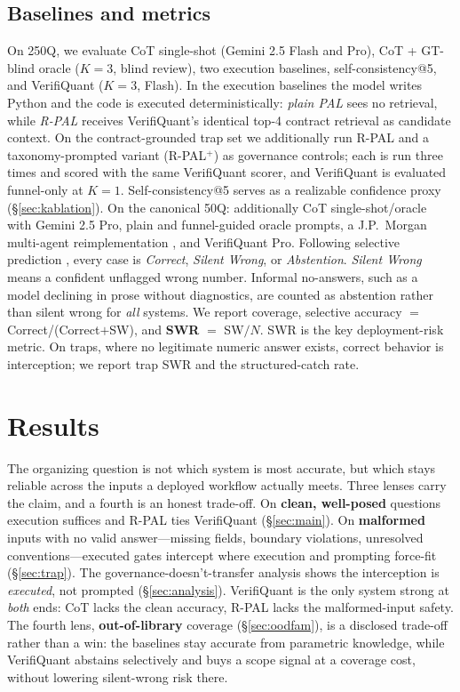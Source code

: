 \subsection{Baselines and metrics}
On 250Q, we evaluate CoT single-shot (Gemini 2.5 Flash and Pro), CoT + GT-blind oracle ($K{=}3$, blind review), two execution baselines, self-consistency@5, and VerifiQuant ($K{=}3$, Flash).
In the execution baselines the model writes Python and the code is executed deterministically: \emph{plain PAL} sees no retrieval, while \emph{R-PAL} receives VerifiQuant's identical top-4 contract retrieval as candidate context.
On the contract-grounded trap set we additionally run R-PAL and a taxonomy-prompted variant (R-PAL$^{+}$) as governance controls; each is run three times and scored with the same VerifiQuant scorer, and VerifiQuant is evaluated funnel-only at $K{=}1$.
Self-consistency@5 serves as a realizable confidence proxy (\S\ref{sec:kablation}).
On the canonical 50Q: additionally CoT single-shot/oracle with Gemini 2.5 Pro, plain and funnel-guided oracle prompts, a J.P.\ Morgan multi-agent reimplementation \cite{kundu2025multiagent}, and VerifiQuant Pro.
Following selective prediction \cite{elyaniv2010foundations,geifman2017selective}, every case is \emph{Correct}, \emph{Silent Wrong}, or \emph{Abstention}.
\emph{Silent Wrong} means a confident unflagged wrong number.
Informal no-answers, such as a model declining in prose without diagnostics, are counted as abstention rather than silent wrong for \emph{all} systems.
We report coverage, selective accuracy $=$ Correct/(Correct$+$SW), and \textbf{SWR} $=$ SW$/N$.
SWR is the key deployment-risk metric.
On traps, where no legitimate numeric answer exists, correct behavior is interception; we report trap SWR and the structured-catch rate.

\section{Results}\label{sec:results}
The organizing question is not which system is most accurate, but which stays reliable across the inputs a deployed workflow actually meets.
Three lenses carry the claim, and a fourth is an honest trade-off.
On \textbf{clean, well-posed} questions execution suffices and R-PAL ties VerifiQuant (\S\ref{sec:main}).
On \textbf{malformed} inputs with no valid answer---missing fields, boundary violations, unresolved conventions---executed gates intercept where execution and prompting force-fit (\S\ref{sec:trap}).
The governance-doesn't-transfer analysis shows the interception is \emph{executed}, not prompted (\S\ref{sec:analysis}).
VerifiQuant is the only system strong at \emph{both} ends: CoT lacks the clean accuracy, R-PAL lacks the malformed-input safety.
The fourth lens, \textbf{out-of-library} coverage (\S\ref{sec:oodfam}), is a disclosed trade-off rather than a win: the baselines stay accurate from parametric knowledge, while VerifiQuant abstains selectively and buys a scope signal at a coverage cost, without lowering silent-wrong risk there.

